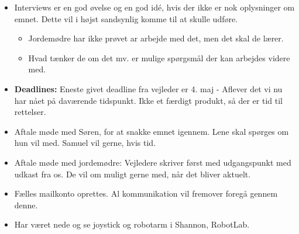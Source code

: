 \begin{itemize}
	\item Interviews er en god øvelse og en god idé, hvis der ikke er nok oplysninger om emnet. Dette vil i højst sandsynlig komme til at skulle udføre.
	\begin{itemize}
		\item Jordemødre har ikke prøvet ar arbejde med det, men det skal de lærer. 
		\item Hvad tænker de om det mv. er mulige spørgsmål der kan arbejdes videre med.
	\end{itemize}
	\item \textbf{Deadlines:} Eneste givet deadline fra vejleder er 4. maj - Aflever det vi nu har nået på daværende tidspunkt. Ikke et færdigt produkt, så der er tid til rettelser.
	\item Aftale møde med Søren, for at snakke emnet igennem. Lene skal spørges om hun vil med. Samuel vil gerne, hvis tid.
	\item Aftale møde med jordemødre: Vejledere skriver først med udgangspunkt med udkast fra os. De vil om muligt gerne med, når det bliver aktuelt. 
	\item Fælles mailkonto oprettes. Al kommunikation vil fremover foregå gennem denne.
	\item Har været nede og se joystick og robotarm i Shannon, RobotLab.  
\end{itemize}

\newpage


